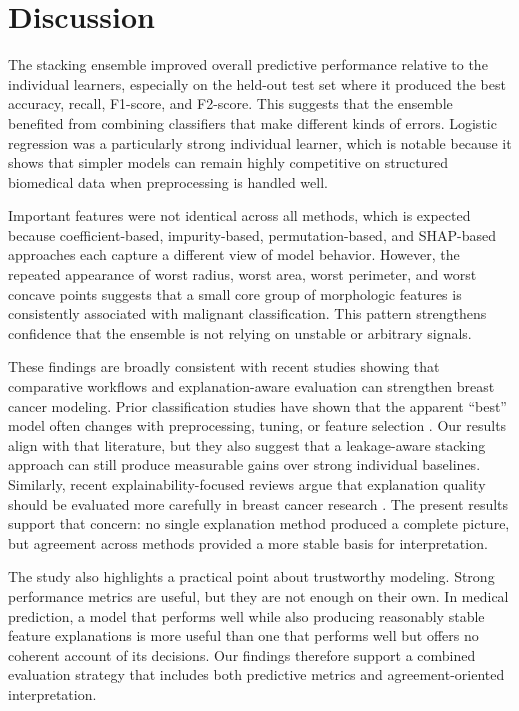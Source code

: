 \documentclass[conference]{IEEEtran}
\begin{document}
\newpage
\section{Discussion}
The stacking ensemble improved overall predictive performance relative to the individual learners, especially on the held-out test set where it produced the best accuracy, recall, F1-score, and F2-score. This suggests that the ensemble benefited from combining classifiers that make different kinds of errors. Logistic regression was a particularly strong individual learner, which is notable because it shows that simpler models can remain highly competitive on structured biomedical data when preprocessing is handled well.

Important features were not identical across all methods, which is expected because coefficient-based, impurity-based, permutation-based, and SHAP-based approaches each capture a different view of model behavior. However, the repeated appearance of worst radius, worst area, worst perimeter, and worst concave points suggests that a small core group of morphologic features is consistently associated with malignant classification. This pattern strengthens confidence that the ensemble is not relying on unstable or arbitrary signals.

These findings are broadly consistent with recent studies showing that comparative workflows and explanation-aware evaluation can strengthen breast cancer modeling. Prior classification studies have shown that the apparent ``best'' model often changes with preprocessing, tuning, or feature selection \cite{b3,b6,b9,b12,b13,b14}. Our results align with that literature, but they also suggest that a leakage-aware stacking approach can still produce measurable gains over strong individual baselines. Similarly, recent explainability-focused reviews argue that explanation quality should be evaluated more carefully in breast cancer research \cite{b7,b17,b18}. The present results support that concern: no single explanation method produced a complete picture, but agreement across methods provided a more stable basis for interpretation.

The study also highlights a practical point about trustworthy modeling. Strong performance metrics are useful, but they are not enough on their own. In medical prediction, a model that performs well while also producing reasonably stable feature explanations is more useful than one that performs well but offers no coherent account of its decisions. Our findings therefore support a combined evaluation strategy that includes both predictive metrics and agreement-oriented interpretation.
\end{document}
